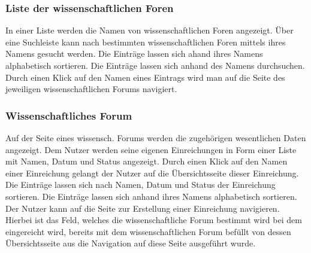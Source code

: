 \subsubsection{Liste der wissenschaftlichen Foren}
\begin{description}
     In einer Liste werden die Namen von wissenschaftlichen Foren angezeigt.
     Über eine Suchleiste kann nach bestimmten wissenschaftlichen Foren mittels
    ihres Namens gesucht werden.
     Die Einträge lassen sich ahand ihres Namens alphabetisch sortieren.
     Die Einträge lassen sich anhand des Namens durchsuchen.
     Durch einen Klick auf den Namen eines Eintrags wird man auf die Seite des
    jeweiligen wissenschaftlichen Forums navigiert.
\end{description}

\subsubsection{Wissenschaftliches Forum}
\begin{description}
     Auf der Seite eines wissensch. Forums werden die zugehörigen wesentlichen Daten
    angezeigt. %
     Dem Nutzer werden seine eigenen Einreichungen in Form einer Liste mit Namen, Datum und Status
    angezeigt.
     Durch einen Klick auf den Namen einer Einreichung gelangt der Nutzer auf die Übersichtsseite
    dieser Einreichung.
     Die Einträge lassen sich nach Namen, Datum und Status
    der Einreichung sortieren.
     Die Einträge lassen sich anhand ihres Namens alphabetisch sortieren.
     Der Nutzer kann auf die Seite zur Erstellung einer Einreichung navigieren. Hierbei ist
    das Feld, welches die wissenschaftliche Forum bestimmt wird bei dem eingereicht wird, bereits mit
    dem wissenschaftlichen Forum befüllt von dessen Übersichtsseite aus die Navigation auf diese
    Seite ausgeführt wurde.
\end{description}

